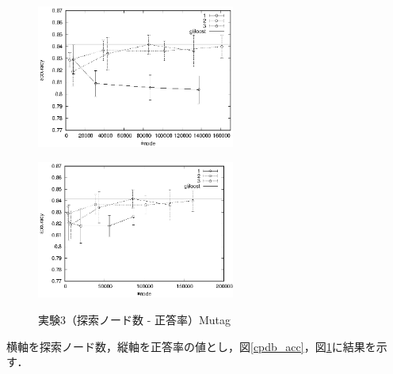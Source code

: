 \begin{figure}[t]
	\begin{minipage}{0.5\hsize}
		\begin{center}
			\includegraphics[width=65mm]{mutag/node_acc.eps}
		\end{center}
		\label{fig:12}
	\end{minipage}
	\begin{minipage}{0.5\hsize}
		\begin{center}
			\includegraphics[width=65mm]{mutag/node_acc_para.eps}
		\end{center}
		\label{fig:13}
	\end{minipage}
	\caption{実験3（探索ノード数 - 正答率）Mutag}
	\label{mutag_acc}
\end{figure}
横軸を探索ノード数，縦軸を正答率の値とし，図\ref{cpdb_acc}，図\ref{mutag_acc}に結果を示す．

